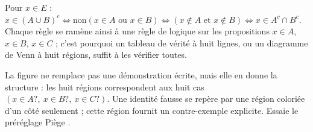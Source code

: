 \begin{preuve}
Pour $x\in E$ : $x\in(A\cup B)^c \iff \text{non}(x\in A \text{ ou } x\in B) \iff (x\notin A \text{ et } x\notin B)\iff x\in A^c\cap B^c$. Chaque règle se ramène ainsi à une règle de logique sur les propositions $x\in A$, $x\in B$, $x\in C$ ; c'est pourquoi un tableau de vérité à huit lignes, ou un diagramme de Venn à huit régions, suffit à les vérifier toutes.
\end{preuve}
\begin{remarque}
La figure ne remplace pas une démonstration écrite, mais elle en donne la structure : les huit régions correspondent aux huit cas $(x\in A ?,\ x\in B ?,\ x\in C ?)$. Une identité fausse se repère par une région coloriée d'un côté seulement ; cette région fournit un contre-exemple explicite. Essaie le préréglage \og Piège \fg.
\end{remarque}

